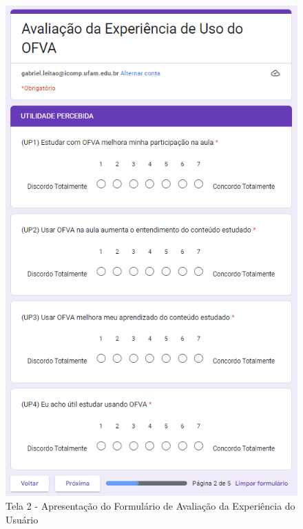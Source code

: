 \begin{figure}[htb]
	\centering
	\includegraphics[width=0.8\linewidth]{chapters/appendixUX/UX_Tela2.png}
	\caption{Tela 2 - Apresentação do Formulário de Avaliação da Experiência do Usuário}
	\label{fig:UX_Tela2}
\end{figure}

